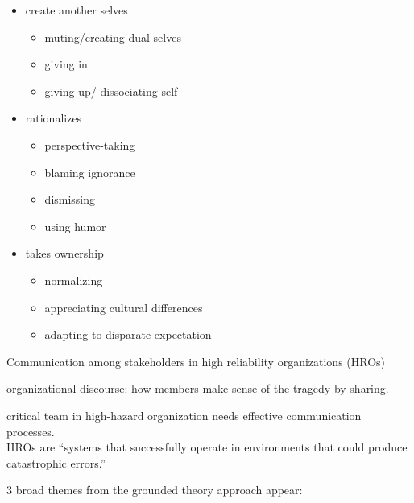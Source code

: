 \documentclass[
]{book}
\providecommand{\tightlist}{%
  \setlength{\itemsep}{0pt}\setlength{\parskip}{0pt}}
\begin{document}
\begin{itemize}
\item
  create another selves

  \begin{itemize}
  \tightlist
  \item
    muting/creating dual selves
  \item
    giving in
  \item
    giving up/ dissociating self
  \end{itemize}
\item
  rationalizes

  \begin{itemize}
  \tightlist
  \item
    perspective-taking
  \item
    blaming ignorance
  \item
    dismissing
  \item
    using humor
  \end{itemize}
\item
  takes ownership

  \begin{itemize}
  \tightlist
  \item
    normalizing
  \item
    appreciating cultural differences
  \item
    adapting to disparate expectation
  \end{itemize}
\end{itemize}

\citep{Williams_2017}

Communication among stakeholders in high reliability organizations (HROs)

organizational discourse: how members make sense of the tragedy by sharing.

critical team in high-hazard organization needs effective communication processes.\\
HROs are ``systems that successfully operate in environments that could produce catastrophic errors.''

3 broad themes from the grounded theory approach appear:
\end{document}
